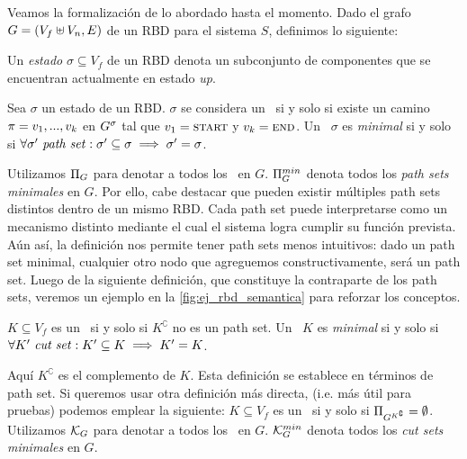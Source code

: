 Veamos la formalización de lo abordado hasta el momento. Dado el grafo $G=(V_f \uplus V_n,E)$ de un RBD para el sistema $S$, definimos lo siguiente:

\begin{definition}
    Un \textit{estado} $\sigma \subseteq V_f$ de un RBD denota un subconjunto de componentes que se encuentran actualmente en estado \textit{up}. 
\end{definition}

\begin{definition}
    Sea $\sigma$ un estado de un RBD. $\sigma$ se considera un \pset\ si y solo si existe un camino $\pi = v_1, ... , v_k$ en $G^{\sigma}$ tal que $v_1 = \textsc{start}$ y $v_k = \textsc{end}$. Un \pset\ $\sigma$ es \textit{minimal} si y solo si $\forall \sigma^\prime \text{ \textit{path set}} : \sigma^\prime \subseteq \sigma \implies \sigma^\prime = \sigma$.
\end{definition}


Utilizamos $\Pi_{G}$ para denotar a todos los \psets\ en $G$. $\Pi_{G}^{min}$ denota todos los \textit{path sets minimales} en $G$.
Por ello, cabe destacar que pueden existir múltiples path sets distintos dentro de un mismo RBD. Cada path set puede interpretarse como un mecanismo distinto mediante el cual el sistema logra cumplir su función prevista. Aún así, la definición nos permite tener path sets menos intuitivos: dado un path set minimal, cualquier otro nodo que agreguemos constructivamente, será un path set. Luego de la siguiente definición, que constituye la contraparte de los path sets, veremos un ejemplo en la \autoref{fig:ej_rbd_semantica} para reforzar los conceptos.

\begin{definition}
$K \subseteq V_f$ es un \cset\ si y solo si $K^\complement$ no es un path set. Un \cset\ $K$ es \textit{minimal} si y solo si $\forall K^\prime \text{ \textit{cut set}} : K^\prime \subseteq K \implies K^\prime = K$.
\end{definition}

Aquí $K^\complement$ es el complemento de $K$. Esta definición se establece en términos de path set. Si queremos usar otra definición más directa, (i.e. más útil para pruebas) podemos emplear la siguiente: 
$K \subseteq V_f$ es un \cset\ si y solo si $\Pi_{G^{K^\complement}} = \emptyset$.
Utilizamos $\mathcal{K}_{G}$ para denotar a todos los \csets\ en $G$. $\mathcal{K}_{G}^{min}$ denota todos los \textit{cut sets minimales} en $G$.

